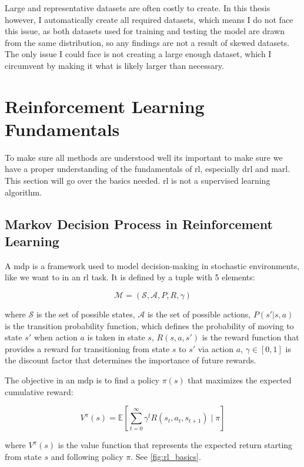 \documentclass[UKenglish]{uiomasterthesis}
\begin{document}
Large and representative datasets are often costly to create. In this thesis however, I automatically create all required datasets, which means I do not face this issue, as both datasets used for training and testing the model are drawn from the same distribution, so any findings are not a result of skewed datasets. The only issue I could face is not creating a large enough dataset, which I circumvent by making it what is likely larger than necessary. 

\section{Reinforcement Learning Fundamentals}
To make sure all methods are understood well its important to make sure we have a proper understanding of the fundamentals of \ac{rl}, especially \ac{drl} and \ac{marl}. This section will go over the basics needed. \ac{rl} is not a supervised learning algorithm.


\subsection{Markov Decision Process in Reinforcement Learning}

A \ac{mdp} is a framework used to model decision-making in stochastic environments, like we want to in an \ac{rl} task. It is defined by a tuple with 5 elements:

$$\mathcal{M} = (\mathcal{S}, \mathcal{A}, P, R, \gamma)$$

where \(\mathcal{S}\) is the set of possible states, \(\mathcal{A}\) is the set of possible actions, \(P(s' | s, a)\) is the transition probability function, which defines the probability of moving to state \(s'\) when action \(a\) is taken in state \(s\), \(R(s, a, s')\) is the reward function that provides a reward for transitioning from state \(s\) to \(s'\) via action \(a\), \(\gamma \in [0,1]\) is the discount factor that determines the importance of future rewards.

The objective in an \ac{mdp} is to find a policy \(\pi(s)\) that maximizes the expected cumulative reward:

$$V^\pi(s) = \mathbb{E} \left[ \sum_{t=0}^{\infty} \gamma^t R(s_t, a_t, s_{t+1}) \mid \pi \right]$$

where \(V^\pi(s)\) is the value function that represents the expected return starting from state \(s\) and following policy \(\pi\). See \cref{fig:rl_basics}.
\end{document}
